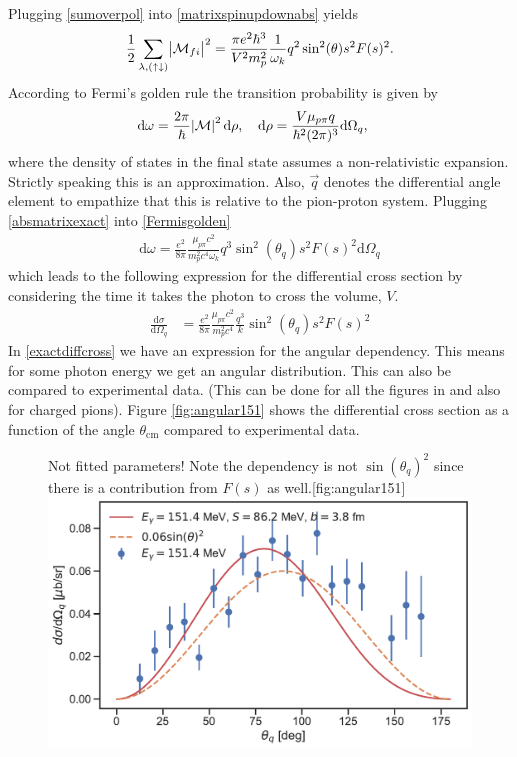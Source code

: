 Plugging \eqref{sumoverpol} into \eqref{matrixspinupdownabs} yields
\begin{equation} \label{absmatrixexact}
    \frac{1}{2}\sum_{\lambda,(\uparrow\downarrow)} \abs{\mathcal{M}_{fi}}^2 = \frac{\pi e^2\hbar^3}{V^2 m_p^2}\frac{1}{\omega_k} q^2\sin^2(\theta) s^2 F(s)^2.
\end{equation}
According to Fermi's golden rule the transition probability is given by
\begin{align}\label{Fermisgolden}
    \text{d}\omega &= \frac{2\pi}{\hbar}\abs{\mathcal{M}}^2\text{d}\rho, \quad \text{d}\rho = \frac{V \mu_{p\pi }q}{\hbar^2(2\pi)^3}\text{d}\Omega_q,
\end{align}
where the density of states in the final state assumes a non-relativistic expansion. Strictly speaking this is an approximation. Also, $\vec{q}$ denotes the differential angle element to empathize that this is relative to the pion-proton system. Plugging \eqref{absmatrixexact} into \eqref{Fermisgolden}
\begin{align}
    \text{d}\omega = \frac{e^2}{8\pi}\frac{\mu_{p\pi }c^2}{m_p^2 c^4 \omega_k}q^3 \sin^2(\theta_q) s^2 F(s)^2 \text{d}\Omega_q
\end{align}
which leads to the following expression for the differential cross section by considering the time it takes the photon to cross the volume, $V$.
\begin{align}\label{exactdiffcross}
    \frac{\text{d}\sigma}{\text{d}\Omega_q} &= \frac{e^2}{8\pi}\frac{\mu_{p\pi}c^2}{m_p^2c^4}\frac{q^3}{k}\sin^2(\theta_q) s^2 F(s)^2
\end{align}
In \eqref{exactdiffcross} we have an expression for the angular dependency. This means for some photon energy we get an angular distribution. This can also be compared to experimental data. (This can be done for all the figures in \cite{Beck_1990} and also for charged pions). Figure \ref{fig:angular151} shows the differential cross section as a function of the angle $\theta_{\text{cm}}$ compared to experimental data.  
\begin{figure}[H]
    \begin{sidecaption}{Not fitted parameters! Note the dependency is not $\sin(\theta_q)^2$ since there is a contribution from $F(s)$ as well.}[fig:angular151]
    \includegraphics[width=\linewidth]{Figures/DiffCross151_rel.pdf}
    \end{sidecaption}
\end{figure}
